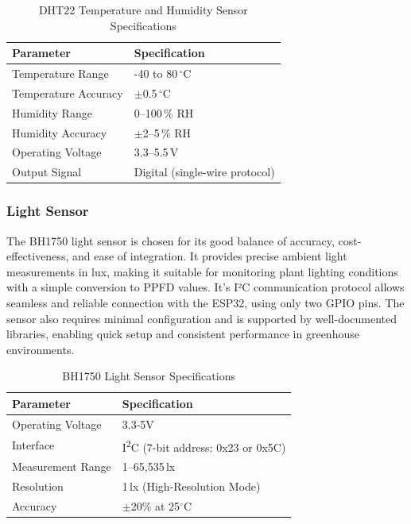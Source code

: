 \begin{table}[H]
	\centering
	\small
	\caption{DHT22 Temperature and Humidity Sensor Specifications}
	\label{tab:dht22_specs}
	\begin{tabular}{ll}
		\toprule
		\textbf{Parameter} & \textbf{Specification} \\
		\midrule
		Temperature Range & -40 to 80\,$^\circ$C \\
		Temperature Accuracy & $\pm$0.5\,$^\circ$C \\
		Humidity Range & 0--100\,\% RH \\
		Humidity Accuracy & $\pm$2--5\,\% RH \\
		Operating Voltage & 3.3--5.5\,V \\
		Output Signal & Digital (single-wire protocol) \\
		\bottomrule
	\end{tabular}
\end{table}


\subsubsection{ Light Sensor}
The BH1750 light sensor is chosen for its good balance of accuracy, cost-effectiveness, and ease of integration. It provides precise ambient light measurements in lux, making it suitable for monitoring plant lighting conditions with a simple conversion to PPFD values. It’s I²C communication protocol allows seamless and reliable connection with the ESP32, using only two GPIO pins. The sensor also requires minimal configuration and is supported by well-documented libraries, enabling quick setup and consistent performance in greenhouse environments.

\begin{table}[H]
	\centering
	\small
	\caption{BH1750 Light Sensor Specifications}
	\label{tab:bh1750_specs}
	\begin{tabular}{ll}
		\toprule
		\textbf{Parameter} & \textbf{Specification} \\
		\midrule
		Operating Voltage & 3.3-5V \\
		Interface & I\textsuperscript{2}C (7-bit address: 0x23 or 0x5C) \\
		Measurement Range & 1--65,535\,lx \\
		Resolution & 1\,lx (High-Resolution Mode) \\
		Accuracy & $\pm$20\% at 25$^\circ$C \\
		\bottomrule
	\end{tabular}
\end{table}


